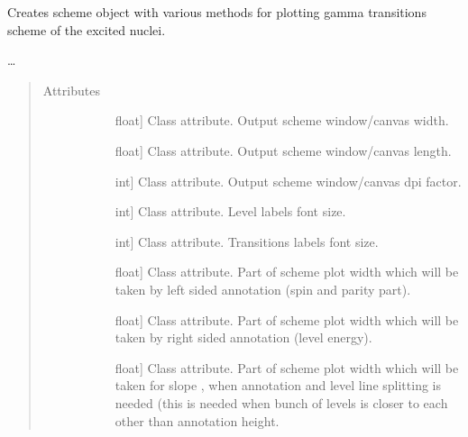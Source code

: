 \documentclass[letterpaper,10pt,english]{sphinxmanual}
\begin{document}
\begin{fulllineitems}
\label{\detokenize{nice_scheme_plotter:nice_scheme_plotter.Scheme}}
Creates scheme object with various methods for plotting gamma transitions scheme of the excited nuclei.

…
\begin{quote}\begin{description}
\item[{Attributes}] \leavevmode\begin{description}
\item[{}] \leavevmode{[}float{]}
Class attribute. Output scheme window/canvas width.

\item[{}] \leavevmode{[}float{]}
Class attribute. Output scheme window/canvas length.

\item[{}] \leavevmode{[}int{]}
Class attribute. Output scheme window/canvas dpi factor.

\item[{}] \leavevmode{[}int{]}
Class attribute. Level labels font size.

\item[{}] \leavevmode{[}int{]}
Class attribute. Transitions labels font size.

\item[{}] \leavevmode{[}float{]}
Class attribute. Part of scheme plot width which will be taken by left sided annotation (spin and parity part).

\item[{}] \leavevmode{[}float{]}
Class attribute. Part of scheme plot width which will be taken by right sided annotation (level energy).

\item[{}] \leavevmode{[}float{]}
Class attribute. Part of scheme plot width which will be taken for slope , when annotation and level line splitting
is needed (this is needed when bunch of levels is closer to each other than annotation height.


\end{description}
\end{description}
\end{quote}
\end{fulllineitems}
\end{document}
